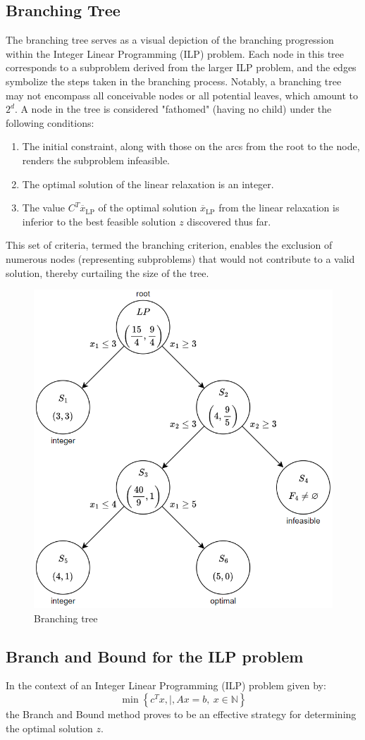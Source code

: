 \subsection{Branching Tree}
The branching tree serves as a visual depiction of the branching progression within the Integer Linear Programming (ILP) problem. 
Each node in this tree corresponds to a subproblem derived from the larger ILP problem, and the edges symbolize the steps taken in the branching process.
Notably, a branching tree may not encompass all conceivable nodes or all potential leaves, which amount to $2^d$. 
A node in the tree is considered "fathomed" (having no child) under the following conditions:
\begin{enumerate}
    \item The initial constraint, along with those on the arcs from the root to the node, renders the subproblem infeasible.
    \item The optimal solution of the linear relaxation is an integer.
    \item The value $C^T \overline{x}_{\text{LP}}$ of the optimal solution $\overline{x}_{\text{LP}}$ from the linear relaxation is inferior to the best feasible solution $z$ discovered thus far.
\end{enumerate}
This set of criteria, termed the branching criterion, enables the exclusion of numerous nodes (representing subproblems) that would not contribute to a valid solution, thereby curtailing the size of the tree.
\begin{figure}[H]
    \centering
    \includegraphics[width=0.5\linewidth]{images/ilp3.png}
    \caption{Branching tree}
\end{figure}

\subsection{Branch and Bound for the ILP problem}
In the context of an Integer Linear Programming (ILP) problem given by:
\[ \min\left\{ c^T x, \mid, Ax = b, \ x \in \mathbb{N} \right\} \]
the Branch and Bound method proves to be an effective strategy for determining the optimal solution $z$.

